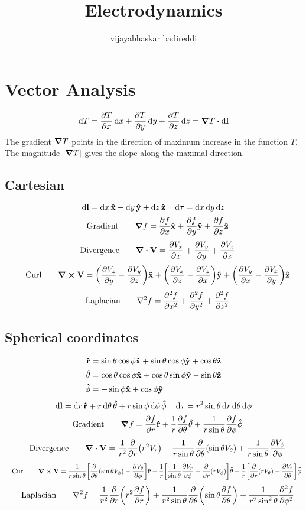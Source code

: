 \documentclass[12pt]{article}
\title{Electrodynamics}
\author{vijayabhaskar badireddi}
\begin{document}

\section{Vector Analysis}
\[\dd{T}=\pdv{T}{x}\dd{x}+\pdv{T}{y}\dd{y}+\pdv{T}{z}\dd{z}=\grad{T}\vdot\dd{\vb{l}}\]
The gradient $\grad{T}$ points in the direction of  maximum increase in the function $T$. The magnitude $|\grad{T}|$ gives the slope along the maximal direction.
\subsection*{Cartesian}
\[\dd{\vb{l}}=\dd{x}\vu{\vb{x}}+\dd{y}\vu{\vb{y}}+\dd{z}\vu{\vb{z}}\quad\dd{\tau}=\dd{x}\dd{y}\dd{z}\]
\[\qq{Gradient}\quad\grad{f}=\pdv{f}{x}\vu{\vb{x}}+\pdv{f}{y}\vu{\vb{y}}+\pdv{f}{z}\vu{\vb{z}}\]
\[\qq{Divergence}\quad\div{\vb{V}}=\pdv{V_x}{x}+\pdv{V_y}{y}+\pdv{V_z}{z}\]
\[\qq{Curl}\quad\curl{\vb{V}}=\qty(\pdv{V_z}{y}-\pdv{V_y}{z})\vu{\vb{x}}+\qty(\pdv{V_x}{z}-\pdv{V_z}{x})\vu{\vb{y}}+\qty(\pdv{V_y}{x}-\pdv{V_x}{y})\vu{\vb{z}}\]
\[\qq{Laplacian}\quad\laplacian{f}=\pdv[2]{f}{x}+\pdv[2]{f}{y}+\pdv[2]{f}{z}\]
\subsection*{Spherical coordinates}
\begin{align*}
\vu{r}&=\sin\theta\cos\phi\vu{x}+\sin\theta\cos\phi\vu{y}+\cos\theta\vu{z}\\
\vu{\theta}&=\cos\theta\cos\phi\vu{x}+\cos\theta\sin\phi\vu{y}-\sin\theta\vu{z}\\
\vu{\phi}&=-\sin\phi\vu{x}+\cos\phi\vu{y}
\end{align*}
\[\dd{\vb{l}}=\dd{r}\vu{\vb{r}}+r\dd{\theta}\vu{\vb{\theta}}+r\sin\phi\dd{\phi}\vu{\vb{\phi}}\quad\dd{\tau}=r^2\sin\theta\dd{r}\dd{\theta}\dd{\phi}\]
\[\qq{Gradient}\quad\grad{f}=\pdv{f}{r}\vu{\vb{r}}+\frac{1}{r}\pdv{f}{\theta}\vu{\vb{\theta}}+\frac{1}{r\sin\theta}\pdv{f}{\phi}\vu{\vb{\phi}}\]
\[\qq{Divergence}\quad\div{\vb{V}}=\frac{1}{r^2}\pdv{r}\qty(r^2V_r)+\frac{1}{r\sin\theta}\pdv{\theta}\qty(\sin{\theta}V_{\theta})+\frac{1}{r\sin\theta}\pdv{V_{\phi}}{\phi}\]
\[\qq{Curl}\quad\curl{\vb{V}}=\frac{1}{r\sin\theta}\bqty{\pdv{\theta}\qty(\sin{\theta}V_{\phi})-\pdv{V_{\theta}}{\phi}}\vu{\vb{r}}+\frac{1}{r}\bqty{\frac{1}{\sin\theta}\pdv{V_r}{\phi}-\pdv{r}\qty(rV_{\phi})}\vu{\vb{\theta}}+\frac{1}{r}\bqty{\pdv{r}\qty(rV_{\theta})-\pdv{V_r}{\theta}}\vu{\vb{\phi}}\]
\[\qq{Laplacian}\quad\laplacian{f}=\frac{1}{r^2}\pdv{r}\qty(r^2\pdv{f}{r})+\frac{1}{r^2\sin\theta}\pdv{\theta}\qty(\sin{\theta}\pdv{f}{\theta})+\frac{1}{r^2\sin^2{\theta}}\pdv[2]{f}{\phi}\]
\end{document}
